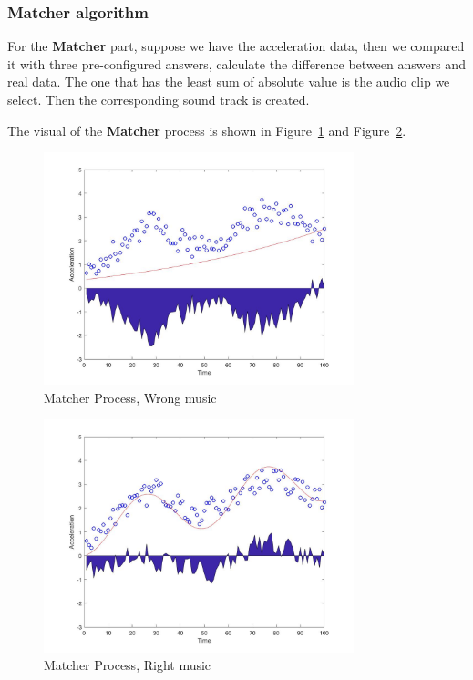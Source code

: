 \newpage

\subsubsection{Matcher algorithm}

For the \textbf{Matcher} part, suppose we have the acceleration data, then we
compared it with three pre-configured answers, calculate the difference between
answers and real data. The one that has the least sum of absolute value is the
audio clip we select. Then the corresponding sound track is created. 

The visual of the \textbf{Matcher} process is shown in Figure~\ref{matcherStep0}
and Figure~\ref{matcherStep1}.


\newcommand{\widthOfMatcherFigure}{9cm}

\begin{figure}[H]
\centering
\includegraphics[width=\widthOfMatcherFigure]{figWR/matcher1}
\caption{Matcher Process, Wrong music}
\label{matcherStep0}
\end{figure}

\begin{figure}[H]
\centering
\includegraphics[width=\widthOfMatcherFigure]{figWR/matcher2}
\caption{Matcher Process, Right music}
\label{matcherStep1}
\end{figure}

